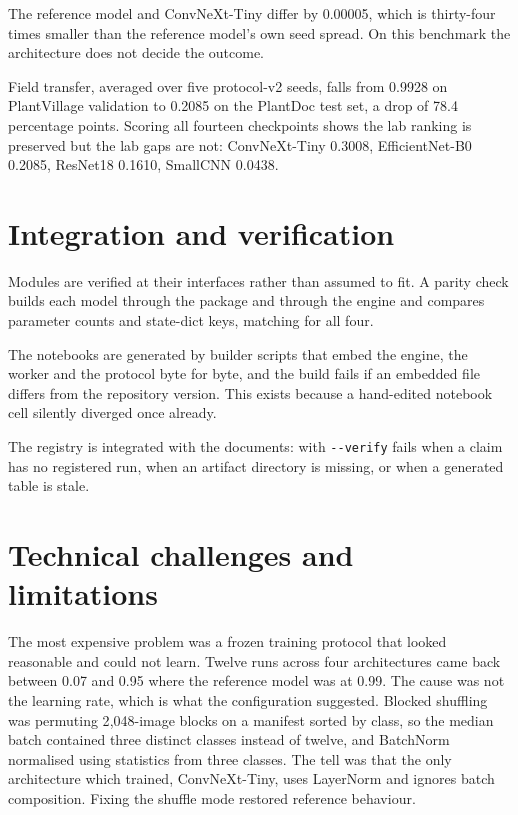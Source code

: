 \documentclass[12pt,a4paper]{report}
\begin{document}
The reference model and ConvNeXt-Tiny differ by 0.00005, which is thirty-four times
smaller than the reference model's own seed spread. On this benchmark the
architecture does not decide the outcome.

Field transfer, averaged over five protocol-v2 seeds, falls from 0.9928 on PlantVillage
validation to 0.2085 on the PlantDoc test set, a drop of 78.4 percentage points. Scoring all fourteen checkpoints
shows the lab ranking is preserved but the lab gaps are not: ConvNeXt-Tiny 0.3008,
EfficientNet-B0 0.2085, ResNet18 0.1610, SmallCNN 0.0438.

\section{Integration and verification}

Modules are verified at their interfaces rather than assumed to fit. A parity check
builds each model through the package and through the engine and compares parameter
counts and state-dict keys, matching for all four.

The notebooks are generated by builder scripts that embed the engine, the worker and
the protocol byte for byte, and the build fails if an embedded file differs from the
repository version. This exists because a hand-edited notebook cell silently diverged
once already.

The registry is integrated with the documents:  with \texttt{-{}-verify}
fails when a claim has no registered run, when an artifact directory is missing, or
when a generated table is stale.

\section{Technical challenges and limitations}

The most expensive problem was a frozen training protocol that looked reasonable and
could not learn. Twelve runs across four architectures came back between 0.07 and
0.95 where the reference model was at 0.99. The cause was not the learning rate,
which is what the configuration suggested. Blocked shuffling was permuting
2{,}048-image blocks on a manifest sorted by class, so the median batch contained
three distinct classes instead of twelve, and BatchNorm normalised using statistics
from three classes. The tell was that the only architecture which trained,
ConvNeXt-Tiny, uses LayerNorm and ignores batch composition. Fixing the shuffle mode
restored reference behaviour.
\end{document}
